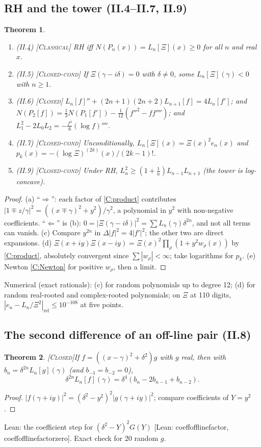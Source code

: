 \documentclass[11pt]{amsart}
\theoremstyle{plain}
\newtheorem{theorem}{Theorem}[section]
\theoremstyle{definition}
\newcommand{\status}[1]{\textsc{[#1]}}
\newcommand{\leanus}{\textunderscore\allowbreak}
\newcommand{\lean}[1]{{\ttfamily\let\_\leanus #1}}
\begin{document}
\subsection{RH and the tower (II.4--II.7, II.9)}
\begin{theorem}\label{thm:tower}
\begin{enumerate}[label=(\alph*)]
\item (II.4) \status{Classical} RH iff $N(P_n(x))=L_n[\Xi](x)\ge0$ for all $n$ and real $x$.
\item (II.5) \status{Closed-cond} If $\Xi(\gamma-i\delta)=0$ with $\delta\ne0$, some $L_n[\Xi](\gamma)<0$ with $n\ge1$.
\item (II.6) \status{Closed} $L_n[f]''+(2n+1)(2n+2)L_{n+1}[f]=4L_n[f']$; and
$N(P_2[f])=\frac13N(P_1[f'])-\frac1{12}(f''^2-ff'''')$; and
$L_1^2-2L_0L_2=-\frac{f^4}{6}(\log f)''''$.
\item (II.7) \status{Closed-cond} Unconditionally,
$L_n[\Xi](x)=\Xi(x)^2e_n(x)$ and $p_k(x)=-(\log\Xi)^{(2k)}(x)/(2k-1)!$.
\item (II.9) \status{Closed-cond} Under RH, $L_n^2\ge(1+\frac1n)L_{n-1}L_{n+1}$ (the tower is log-concave).
\end{enumerate}
\end{theorem}
\begin{proof}
(a) ``$\Rightarrow$'': each factor of \ref{C:product} contributes
$|1\mp z/\gamma|^2=((x\mp\gamma)^2+y^2)/\gamma^2$, a polynomial in $y^2$ with
non-negative coefficients. ``$\Leftarrow$'' is (b): $0=|\Xi(\gamma-i\delta)|^2=\sum L_n(\gamma)\delta^{2n}$,
and not all terms can vanish. (c) Compare $y^{2n}$ in $\Delta|f|^2=4|f'|^2$; the
other two are direct expansions. (d) $\Xi(x+iy)\Xi(x-iy)=\Xi(x)^2\prod_\rho(1+y^2w_\rho(x))$
by \ref{C:product}, absolutely convergent since $\sum|w_\rho|<\infty$; take
logarithms for $p_k$. (e) Newton \ref{C:Newton} for positive $w_\rho$, then a limit.
\end{proof}
\noindent Numerical (exact rationals): (c) for random polynomials up to degree 12;
(d) for random real-rooted and complex-rooted polynomials; on $\Xi$ at
110 digits, $|e_n-L_n/\Xi^2|_{\mathrm{rel}}\le10^{-108}$ at five points.

\subsection{The second difference of an off-line pair (II.8)}
\begin{theorem}\status{Closed}\label{thm:T28}
If $f=((x-\gamma)^2+\delta^2)g$ with $g$ real, then with $b_n=\delta^{2n}L_n[g](\gamma)$
(and $b_{-1}=b_{-2}=0$),
\[
\delta^{2n}L_n[f](\gamma)=\delta^4(b_n-2b_{n-1}+b_{n-2}).
\]
\end{theorem}
\begin{proof}
$|f(\gamma+iy)|^2=(\delta^2-y^2)^2|g(\gamma+iy)|^2$; compare coefficients of $Y=y^2$.
\end{proof}
\noindent Lean: the coefficient step for $(\delta^2-Y)^2G(Y)$
\lean{[Lean: coeff\_offline\_factor, coeff\_offline\_factor\_zero]}. Exact check for 20 random $g$.
\end{document}
